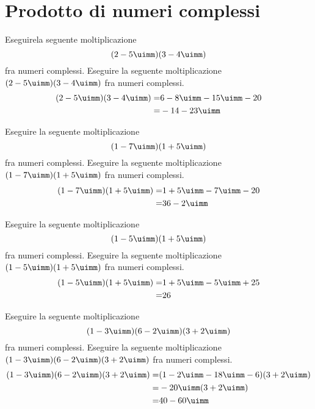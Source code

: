  \section{Prodotto di  numeri complessi}
 \begin{exercise}
Eseguirela seguente moltiplicazione\[(2-5\uimm)(3-4\uimm) \] fra numeri complessi.
\tcblower
Eseguire la seguente moltiplicazione $(2-5\uimm)(3-4\uimm)$ fra numeri complessi.
\begin{align*}
(2-5\uimm)(3-4\uimm)=&6-8\uimm-15\uimm-20\\
=&-14-23\uimm
\end{align*}
 \end{exercise}
 \begin{exercise}
	Eseguire la seguente moltiplicazione\[(1-7\uimm)(1+5\uimm) \]fra numeri complessi.
	\tcblower
	Eseguire la seguente moltiplicazione $(1-7\uimm)(1+5\uimm)$ fra numeri complessi.
	\begin{align*}
	(1-7\uimm)(1+5\uimm)=&1+5\uimm-7\uimm-20\\
	=&36-2\uimm
	\end{align*}
\end{exercise}
 \begin{exercise}
	Eseguire la seguente moltiplicazione\[(1-5\uimm)(1+5\uimm) \] fra numeri complessi.
	\tcblower
	Eseguire la seguente moltiplicazione $(1-5\uimm)(1+5\uimm)$ fra numeri complessi.
	\begin{align*}
	(1-5\uimm)(1+5\uimm)=&1+5\uimm-5\uimm+25\\
	=&26
	\end{align*}
\end{exercise}
\begin{exercise}
	Eseguire la seguente moltiplicazione\[(1-3\uimm)(6-2\uimm)(3+2\uimm)\] fra numeri complessi.
	\tcblower
	Eseguire la seguente moltiplicazione $(1-3\uimm)(6-2\uimm)(3+2\uimm)$ fra numeri complessi.
	\begin{align*}
	(1-3\uimm)(6-2\uimm)(3+2\uimm)=&(1-2\uimm-18\uimm-6)(3+2\uimm)\\
	=&-20\uimm(3+2\uimm)\\
	=&40-60\uimm\\
	\end{align*}
\end{exercise}

 